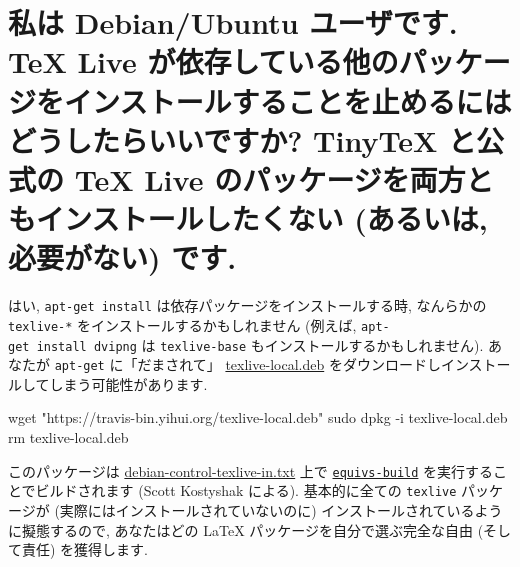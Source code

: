 \documentclass[
  xelatex,ja=standard,jafont=noto]{bxjsreport}
\newenvironment{Shaded}{\begin{snugshade}}{\end{snugshade}}
\newcommand{\AttributeTok}[1]{\textcolor[rgb]{0.77,0.63,0.00}{#1}}
\newcommand{\FunctionTok}[1]{\textcolor[rgb]{0.00,0.00,0.00}{#1}}
\newcommand{\NormalTok}[1]{#1}
\newcommand{\StringTok}[1]{\textcolor[rgb]{0.31,0.60,0.02}{#1}}
\begin{document}
\hypertarget{ux79c1ux306f-debianubuntu-ux30e6ux30fcux30b6ux3067ux3059.-tex-live-ux304cux4f9dux5b58ux3057ux3066ux3044ux308bux4ed6ux306eux30d1ux30c3ux30b1ux30fcux30b8ux3092ux30a4ux30f3ux30b9ux30c8ux30fcux30ebux3059ux308bux3053ux3068ux3092ux6b62ux3081ux308bux306bux306fux3069ux3046ux3057ux305fux3089ux3044ux3044ux3067ux3059ux304b-tinytex-ux3068ux516cux5f0fux306e-tex-live-ux306eux30d1ux30c3ux30b1ux30fcux30b8ux3092ux4e21ux65b9ux3068ux3082ux30a4ux30f3ux30b9ux30c8ux30fcux30ebux3057ux305fux304fux306aux3044-ux3042ux308bux3044ux306f-ux5fc5ux8981ux304cux306aux3044-ux3067ux3059.}{%
\section{私は Debian/Ubuntu ユーザです. TeX Live
が依存している他のパッケージをインストールすることを止めるにはどうしたらいいですか?
TinyTeX と公式の TeX Live のパッケージを両方ともインストールしたくない
(あるいは, 必要がない)
です.}\label{ux79c1ux306f-debianubuntu-ux30e6ux30fcux30b6ux3067ux3059.-tex-live-ux304cux4f9dux5b58ux3057ux3066ux3044ux308bux4ed6ux306eux30d1ux30c3ux30b1ux30fcux30b8ux3092ux30a4ux30f3ux30b9ux30c8ux30fcux30ebux3059ux308bux3053ux3068ux3092ux6b62ux3081ux308bux306bux306fux3069ux3046ux3057ux305fux3089ux3044ux3044ux3067ux3059ux304b-tinytex-ux3068ux516cux5f0fux306e-tex-live-ux306eux30d1ux30c3ux30b1ux30fcux30b8ux3092ux4e21ux65b9ux3068ux3082ux30a4ux30f3ux30b9ux30c8ux30fcux30ebux3057ux305fux304fux306aux3044-ux3042ux308bux3044ux306f-ux5fc5ux8981ux304cux306aux3044-ux3067ux3059.}}

はい, \texttt{apt-get\ install} は依存パッケージをインストールする時,
なんらかの \texttt{texlive-*} をインストールするかもしれません (例えば,
\texttt{apt-get\ install\ dvipng} は \texttt{texlive-base}
もインストールするかもしれません). あなたが \texttt{apt-get}
に「だまされて」
\href{https://travis-bin.yihui.org/texlive-local.deb}{texlive-local.deb}
をダウンロードしインストールしてしまう可能性があります.

\begin{Shaded}
\begin{Highlighting}[]
\FunctionTok{wget} \StringTok{"https://travis{-}bin.yihui.org/texlive{-}local.deb"}
\FunctionTok{sudo}\NormalTok{ dpkg }\AttributeTok{{-}i}\NormalTok{ texlive{-}local.deb}
\FunctionTok{rm}\NormalTok{ texlive{-}local.deb}
\end{Highlighting}
\end{Shaded}

このパッケージは
\href{https://github.com/scottkosty/install-tl-ubuntu/blob/master/debian-control-texlive-in.txt}{debian-control-texlive-in.txt}
上で
\href{http://manpages.ubuntu.com/manpages/trusty/man1/equivs-build.1.html}{\texttt{equivs-build}}
を実行することでビルドされます (Scott Kostyshak による). 基本的に全ての
\texttt{texlive} パッケージが (実際にはインストールされていないのに)
インストールされているように擬態するので, あなたはどの LaTeX
パッケージを自分で選ぶ完全な自由 (そして責任) を獲得します.
\end{document}
